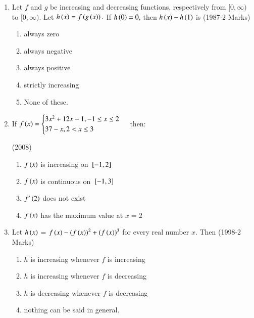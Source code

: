 \documentclass[journal,12pt,twocolumn]{IEEEtran}
\theoremstyle{remark}
\begin{document}
\begin{enumerate}
        \item
	Let $f$ and $g$ be increasing and decreasing functions, respectively from $[0,\infty)$ to $[0,\infty)$. Let $h\left(x\right) = f\left(g\left(x\right)\right).$ If $h\left(0\right) = 0,$ then $h\left(x\right)-h\left(1\right)$ is
	 \hfill(1987-2 Marks)
        \begin{enumerate}
          \item always zero
          \item always negative
          \item always positive
          \item strictly increasing
          \item None of these.\\
        \end{enumerate}

       \item 
       If  
	$ f\left(x\right)=\begin{cases} 
       3x^2+12x-1,-1 \le x\le 2\\
       37-x ,2<x \le 3
       \end{cases}$ then:
       
	 \hfill(2008)
       \begin{enumerate}
	 \item $f\left(x\right)$ is increasing on ${}\left[-1,2\right]$
	 \item $f\left(x\right)$ is continuous on ${}\left[-1,3\right]$
	 \item $f'\left(2\right)$ does not exist
	 \item $f\left(x\right)$ has the maximum value at $x=2$\\
       \end{enumerate}

     \item
	     Let $h\left(x\right)$ = $f\left(x\right)-(f\left(x\right))^2+ (f\left(x\right))^3$  for every real number $x.$ Then
     \hfill(1998-2 Marks)\\
     \begin{enumerate}
      \item $h$ is increasing whenever $f$ is increasing
      \item $h$ is increasing whenever $f$ is decreasing
      \item $h$ is decreasing whenever $f$ is decreasing
      \item nothing can be said in general.\\
     \end{enumerate}
 \end{enumerate}
\end{document}

